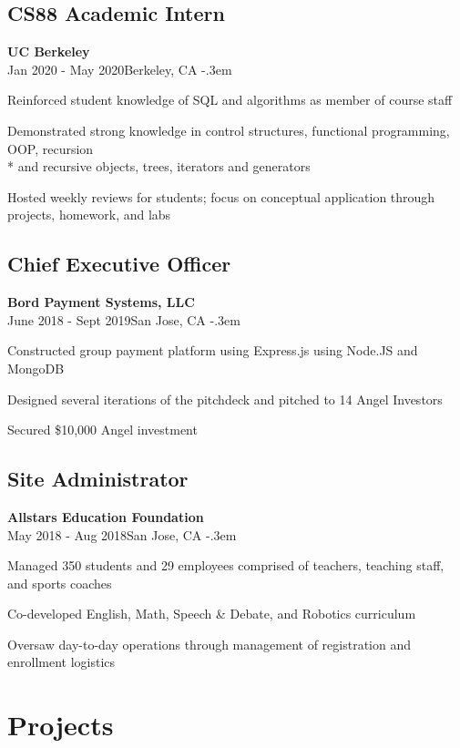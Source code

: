 \documentclass{article}
\let\olditemize=\itemize \let\endolditemize=\enditemize
\renewenvironment{itemize}{\olditemize[topsep=0em] \itemsep-.3em}{\endolditemize}
\newcommand{\entry}[3]{\quad\textbf{#1}\\#2\qquad#3}
\begin{document}
	\subsection{CS88 Academic Intern}
	\entry{UC Berkeley}{Jan 2020 - May 2020}{Berkeley, CA}
	\begin{itemize}
		\item Reinforced student knowledge of SQL and
		algorithms as member of course staff
		\item Demonstrated strong knowledge in control structures, functional programming,
		OOP, recursion \\* and recursive objects, trees, iterators and generators
		\item Hosted weekly reviews for students; focus on conceptual
		application through projects, homework, and labs
	\end{itemize}
	
	\subsection{Chief Executive Officer}
	\entry{Bord Payment Systems, LLC}{June 2018 - Sept 2019}{San Jose, CA}
	\begin{itemize}
		\item Constructed group payment platform using Express.js using Node.JS and MongoDB
		\item Designed several iterations of the pitchdeck and pitched to 14 Angel Investors
		\item Secured \$10,000 Angel investment
	\end{itemize}
	\subsection{Site Administrator}
	\entry{Allstars Education Foundation}{May 2018 - Aug 2018}{San Jose, CA}
	\begin{itemize}
		\item Managed 350 students and 29 employees comprised of teachers, teaching staff, and sports coaches
		\item Co-developed English, Math, Speech \& Debate, and Robotics curriculum
		\item Oversaw day-to-day operations through management of registration and enrollment logistics
	\end{itemize}
	
	\section{Projects}
\end{document}
